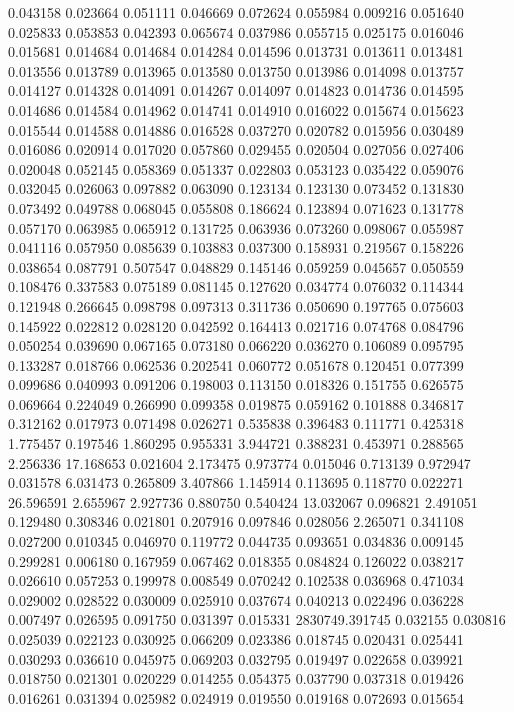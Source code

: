 0.043158
0.023664
0.051111
0.046669
0.072624
0.055984
0.009216
0.051640
0.025833
0.053853
0.042393
0.065674
0.037986
0.055715
0.025175
0.016046
0.015681
0.014684
0.014684
0.014284
0.014596
0.013731
0.013611
0.013481
0.013556
0.013789
0.013965
0.013580
0.013750
0.013986
0.014098
0.013757
0.014127
0.014328
0.014091
0.014267
0.014097
0.014823
0.014736
0.014595
0.014686
0.014584
0.014962
0.014741
0.014910
0.016022
0.015674
0.015623
0.015544
0.014588
0.014886
0.016528
0.037270
0.020782
0.015956
0.030489
0.016086
0.020914
0.017020
0.057860
0.029455
0.020504
0.027056
0.027406
0.020048
0.052145
0.058369
0.051337
0.022803
0.053123
0.035422
0.059076
0.032045
0.026063
0.097882
0.063090
0.123134
0.123130
0.073452
0.131830
0.073492
0.049788
0.068045
0.055808
0.186624
0.123894
0.071623
0.131778
0.057170
0.063985
0.065912
0.131725
0.063936
0.073260
0.098067
0.055987
0.041116
0.057950
0.085639
0.103883
0.037300
0.158931
0.219567
0.158226
0.038654
0.087791
0.507547
0.048829
0.145146
0.059259
0.045657
0.050559
0.108476
0.337583
0.075189
0.081145
0.127620
0.034774
0.076032
0.114344
0.121948
0.266645
0.098798
0.097313
0.311736
0.050690
0.197765
0.075603
0.145922
0.022812
0.028120
0.042592
0.164413
0.021716
0.074768
0.084796
0.050254
0.039690
0.067165
0.073180
0.066220
0.036270
0.106089
0.095795
0.133287
0.018766
0.062536
0.202541
0.060772
0.051678
0.120451
0.077399
0.099686
0.040993
0.091206
0.198003
0.113150
0.018326
0.151755
0.626575
0.069664
0.224049
0.266990
0.099358
0.019875
0.059162
0.101888
0.346817
0.312162
0.017973
0.071498
0.026271
0.535838
0.396483
0.111771
0.425318
1.775457
0.197546
1.860295
0.955331
3.944721
0.388231
0.453971
0.288565
2.256336
17.168653
0.021604
2.173475
0.973774
0.015046
0.713139
0.972947
0.031578
6.031473
0.265809
3.407866
1.145914
0.113695
0.118770
0.022271
26.596591
2.655967
2.927736
0.880750
0.540424
13.032067
0.096821
2.491051
0.129480
0.308346
0.021801
0.207916
0.097846
0.028056
2.265071
0.341108
0.027200
0.010345
0.046970
0.119772
0.044735
0.093651
0.034836
0.009145
0.299281
0.006180
0.167959
0.067462
0.018355
0.084824
0.126022
0.038217
0.026610
0.057253
0.199978
0.008549
0.070242
0.102538
0.036968
0.471034
0.029002
0.028522
0.030009
0.025910
0.037674
0.040213
0.022496
0.036228
0.007497
0.026595
0.091750
0.031397
0.015331
2830749.391745
0.032155
0.030816
0.025039
0.022123
0.030925
0.066209
0.023386
0.018745
0.020431
0.025441
0.030293
0.036610
0.045975
0.069203
0.032795
0.019497
0.022658
0.039921
0.018750
0.021301
0.020229
0.014255
0.054375
0.037790
0.037318
0.019426
0.016261
0.031394
0.025982
0.024919
0.019550
0.019168
0.072693
0.015654
